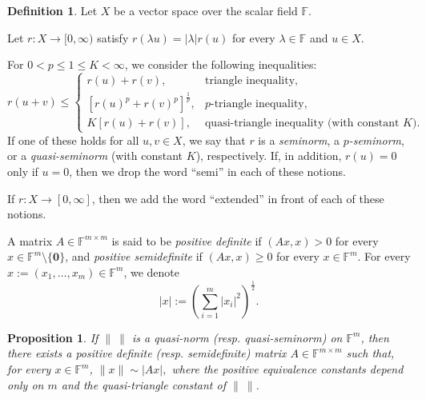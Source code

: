 \documentclass[11pt, reqno]{amsart}
\newtheorem{proposition}[theorem]{Proposition}
\theoremstyle{definition}
\newtheorem{definition}[theorem]{Definition}
\theoremstyle{remark}
\numberwithin{equation}{section}
\newcommand{\F}{\mathbb F}
\begin{document}
\begin{definition}\label{seminorm}
Let $X$ be a vector space over the scalar field $\F$.

Let $r:X\to[0,\infty)$ satisfy $r(\lambda u)=|\lambda|r( u)$ for every  $\lambda\in\F$ and $u\in X$.

For $0<p\leq 1\leq K<\infty$, we consider the following inequalities:
\begin{equation}\label{eq:quasi-tri}
  r(u+v)\leq\begin{cases}
  r(u)+r(v), & \text{triangle inequality}, \\
  [r(u)^p+r(v)^p]^{\frac1p}, & p\text{-triangle inequality}, \\
  K[r(u)+r(v)], & \text{quasi-triangle inequality (with constant $K$)}.\end{cases}
\end{equation}
If one of these holds for all $u,v\in X$, we say that $r$ is
a \emph{seminorm}, a \emph{$p$-seminorm}, or a \emph{quasi-seminorm}
(with constant $K$), respectively.
If, in addition, $r(u)=0$ only if $u=0$, then we drop the word ``semi'' in each of these notions.

If $r:X\to[0,\infty]$, then we add the word ``extended'' in front of each of these notions.
\end{definition}

A matrix $A\in\F^{m\times m}$ is said to be {\em positive definite} if $(Ax,x)>0$
for every $x\in\F^m\setminus\{\mathbf0\}$, and
{\em positive semidefinite} if $(Ax,x)\geq0$ for every $x\in\mathbb F^m$.
For every $x:=(x_1,\ldots,x_m)\in\mathbb F^m$, we denote $$|x|:=(\sum_{i=1}^m |x_i|^2)^{\frac12}.$$

\begin{proposition}\label{qn red op}
If $\|\ \|$ is a quasi-norm (resp. quasi-seminorm) on $\F^m$,
then there exists a positive definite (resp. semidefinite) matrix
$A\in\F^{m\times m}$ such that, for every $x\in \F^m$,
$
\|x\|\sim |Ax|,
$
where the positive equivalence constants depend only on $m$ and the quasi-triangle constant of $\|\ \|$.
\end{proposition}
\end{document}
